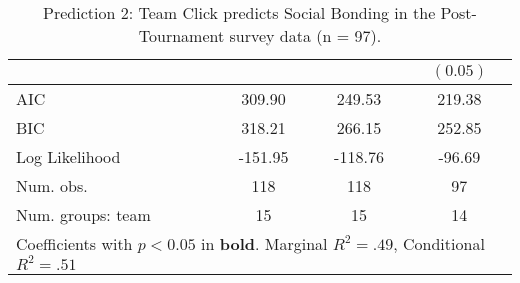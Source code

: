 \begin{table}
\begin{center}
\begin{tabular}{l c c c }
                                      &          &                       & $(0.05)$              \\
\midrule
AIC                                   & 309.90   & 249.53                & 219.38                \\
BIC                                   & 318.21   & 266.15                & 252.85                \\
Log Likelihood                        & -151.95  & -118.76               & -96.69                \\
Num. obs.                             & 118      & 118                   & 97                    \\
Num. groups: team                     & 15       & 15                    & 14                    \\
\bottomrule
\multicolumn{4}{l}{\scriptsize{Coefficients with $p < 0.05$ in \textbf{bold}. Marginal $R^2 = .49$, Conditional $R^2 = .51$}}
\end{tabular}
\caption{Prediction 2: Team Click predicts Social Bonding in the Post-Tournament survey data (n = 97).}
\label{tab:MLM2aTeamClickBonding}
\end{center}
\end{table}
